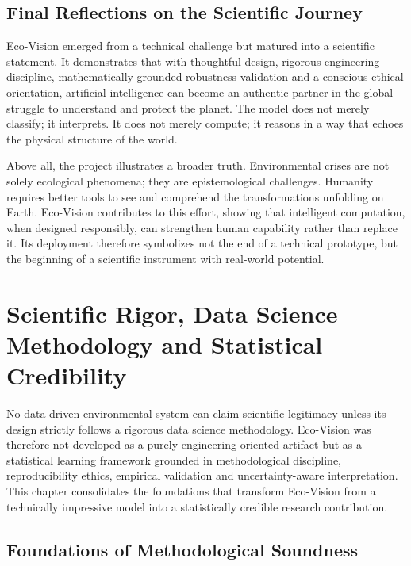 \documentclass[12pt,a4paper]{report}
\begin{document}
\section{Final Reflections on the Scientific Journey}

Eco-Vision emerged from a technical challenge but matured into a scientific statement. It demonstrates that with thoughtful design, rigorous engineering discipline, mathematically grounded robustness validation and a conscious ethical orientation, artificial intelligence can become an authentic partner in the global struggle to understand and protect the planet. The model does not merely classify; it interprets. It does not merely compute; it reasons in a way that echoes the physical structure of the world.

Above all, the project illustrates a broader truth. Environmental crises are not solely ecological phenomena; they are epistemological challenges. Humanity requires better tools to see and comprehend the transformations unfolding on Earth. Eco-Vision contributes to this effort, showing that intelligent computation, when designed responsibly, can strengthen human capability rather than replace it. Its deployment therefore symbolizes not the end of a technical prototype, but the beginning of a scientific instrument with real-world potential.

\newpage

\chapter{Scientific Rigor, Data Science Methodology and Statistical Credibility}

No data-driven environmental system can claim scientific legitimacy unless its design strictly follows a rigorous data science methodology. Eco-Vision was therefore not developed as a purely engineering-oriented artifact but as a statistical learning framework grounded in methodological discipline, reproducibility ethics, empirical validation and uncertainty-aware interpretation. This chapter consolidates the foundations that transform Eco-Vision from a technically impressive model into a statistically credible research contribution.

\section{Foundations of Methodological Soundness}
\end{document}
